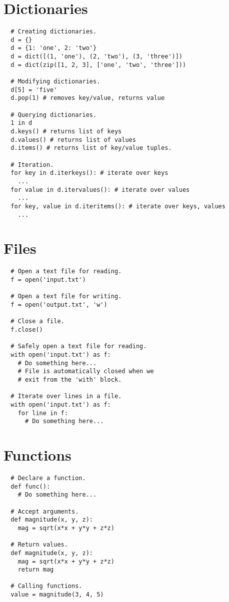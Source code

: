 \documentclass[10pt]{article}
\begin{document}
\section{Dictionaries}
\begin{lstlisting}
  # Creating dictionaries.
  d = {}
  d = {1: 'one', 2: 'two'}
  d = dict([(1, 'one'), (2, 'two'), (3, 'three')])
  d = dict(zip([1, 2, 3], ['one', 'two', 'three']))

  # Modifying dictionaries.
  d[5] = 'five'
  d.pop(1) # removes key/value, returns value

  # Querying dictionaries.
  1 in d
  d.keys() # returns list of keys
  d.values() # returns list of values
  d.items() # returns list of key/value tuples.

  # Iteration.
  for key in d.iterkeys(): # iterate over keys
    ...
  for value in d.itervalues(): # iterate over values
    ...
  for key, value in d.iteritems(): # iterate over keys, values
    ...
\end{lstlisting}

\section{Files}
\begin{lstlisting}
  # Open a text file for reading.
  f = open('input.txt')

  # Open a text file for writing.
  f = open('output.txt', 'w')

  # Close a file.
  f.close()

  # Safely open a text file for reading.
  with open('input.txt') as f:
    # Do something here...
    # File is automatically closed when we
    # exit from the 'with' block.

  # Iterate over lines in a file.
  with open('input.txt') as f:
    for line in f:
      # Do something here...
\end{lstlisting}

\section{Functions}
\begin{lstlisting}
  # Declare a function.
  def func():
    # Do something here...

  # Accept arguments.
  def magnitude(x, y, z):
    mag = sqrt(x*x + y*y + z*z)

  # Return values.
  def magnitude(x, y, z):
    mag = sqrt(x*x + y*y + z*z)
    return mag

  # Calling functions.
  value = magnitude(3, 4, 5)
\end{lstlisting}
\end{document}
